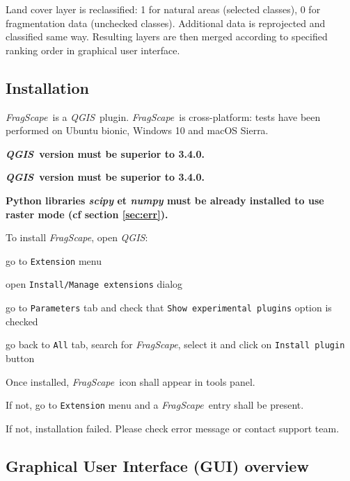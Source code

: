 \documentclass[11pt]{article}
\newcommand{\tool}{\emph{FragScape}}
\newcommand{\qgis}{\emph{QGIS}}
\let\tempone\itemize
\let\temptwo\enditemize
\renewenvironment{itemize}{\tempone\addtolength{\itemsep}{-0.5\baselineskip}}{\temptwo}
\renewenvironment{enumerate}{\tempone\addtolength{\itemsep}{-0.5\baselineskip}}{\temptwo}
\begin{document}
Land cover layer is reclassified: 1 for natural areas (selected classes), 0 for fragmentation data (unchecked classes).
Additional data is reprojected and classified same way. Resulting layers are then merged according to specified ranking order in graphical user interface.

\subsection{Installation}

\tool\ is a \qgis\ plugin. \tool\ is  cross-platform: tests have been performed on Ubuntu bionic, Windows 10 and macOS Sierra.

\textbf{\color{red}\qgis\ version must be superior to 3.4.0.}

\begin{itemize}
    \item \textbf{\color{red}\qgis\ version must be superior to 3.4.0.}
    \item \textbf{\color{red}Python libraries \emph{scipy} et \emph{numpy} must be already installed to use raster mode (cf section \ref{sec:err}).}
\end{itemize}
\frameboxend

To install \tool, open \qgis:
\begin{enumerate}
    \item go to \texttt{Extension} menu
    \item open \texttt{Install/Manage extensions} dialog
    \item go to \texttt{Parameters} tab and check that \texttt{Show experimental plugins} option is checked 
    \item go back to \texttt{All} tab, search for \tool, select it and click on \texttt{Install plugin} button
\end{enumerate}

Once installed, \tool\ icon  shall appear in tools panel.

If not, go to \texttt{Extension} menu and a \tool\ entry shall be present.

If not, installation failed. Please check error message or contact support team.

\bigskip

\subsection{Graphical User Interface (GUI) overview}
\end{document}
